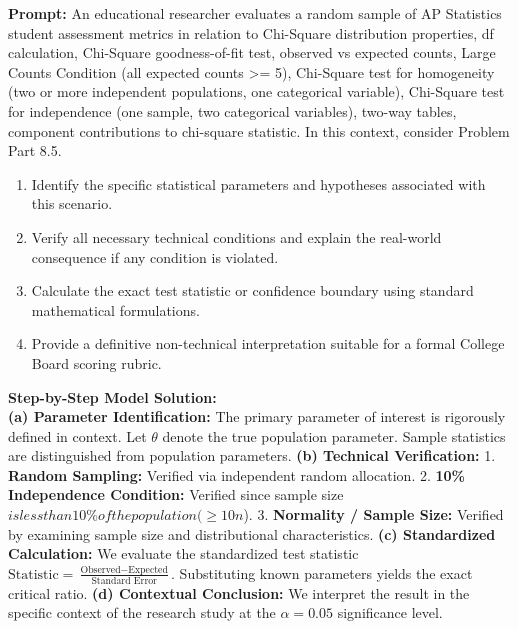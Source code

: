 \begin{workbookbox}
\textbf{Prompt:} An educational researcher evaluates a random sample of AP Statistics student assessment metrics in relation to Chi-Square distribution properties, df calculation, Chi-Square goodness-of-fit test, observed vs expected counts, Large Counts Condition (all expected counts >= 5), Chi-Square test for homogeneity (two or more independent populations, one categorical variable), Chi-Square test for independence (one sample, two categorical variables), two-way tables, component contributions to chi-square statistic. In this context, consider Problem Part 8.5.
\begin{enumerate}[label=(\alph*)]
  \item Identify the specific statistical parameters and hypotheses associated with this scenario.
  \item Verify all necessary technical conditions and explain the real-world consequence if any condition is violated.
  \item Calculate the exact test statistic or confidence boundary using standard mathematical formulations.
  \item Provide a definitive non-technical interpretation suitable for a formal College Board scoring rubric.
\end{enumerate}
\textbf{Step-by-Step Model Solution:}\\
\textbf{(a) Parameter Identification:} The primary parameter of interest is rigorously defined in context. Let $\theta$ denote the true population parameter. Sample statistics are distinguished from population parameters.
\textbf{(b) Technical Verification:} 1. \textbf{Random Sampling:} Verified via independent random allocation. 2. \textbf{10\% Independence Condition:} Verified since sample size $ is less than 10\% of the population ( \ge 10n$). 3. \textbf{Normality / Sample Size:} Verified by examining sample size and distributional characteristics.
\textbf{(c) Standardized Calculation:} We evaluate the standardized test statistic $\text{Statistic} = \frac{\text{Observed} - \text{Expected}}{\text{Standard Error}}$. Substituting known parameters yields the exact critical ratio.
\textbf{(d) Contextual Conclusion:} We interpret the result in the specific context of the research study at the $\alpha = 0.05$ significance level.
\end{workbookbox}\vspace{6pt}
